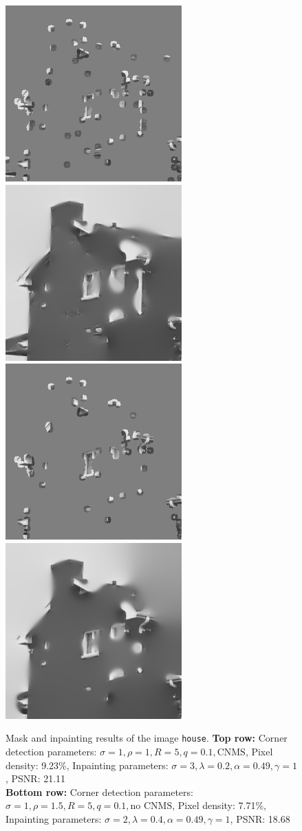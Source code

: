 \begin{figure}[ht]
    \centering
    \includegraphics[width=0.4\linewidth]{../Images/house/house-mask.png}
    \includegraphics[width=0.4\linewidth]{../Images/house/house-inpaint.png}\\\vspace*{0.2cm}
    \includegraphics[width=0.4\linewidth]{../Images/house/house-mask3.png}
    \includegraphics[width=0.4\linewidth]{../Images/house/house-inpaint3.png}
    \caption{Mask and inpainting results of the image \texttt{house}. 
        \textbf{Top row: }Corner detection parameters: $\sigma=1,\rho=1,R=5,q=0.1, \text{CNMS}$, Pixel density: 9.23\%, Inpainting parameters:
    $\sigma=3,\lambda=0.2,\alpha=0.49,\gamma=1$, PSNR\@: 21.11\\
    \textbf{Bottom row: }Corner detection parameters: $\sigma=1,\rho=1.5,R=5,q=0.1, \text{no
    CNMS}$, Pixel density: 7.71\%, Inpainting parameters:
    $\sigma=2,\lambda=0.4,\alpha=0.49,\gamma=1$, PSNR\@: 18.68}\label{fig:HouseEx}
\end{figure}
